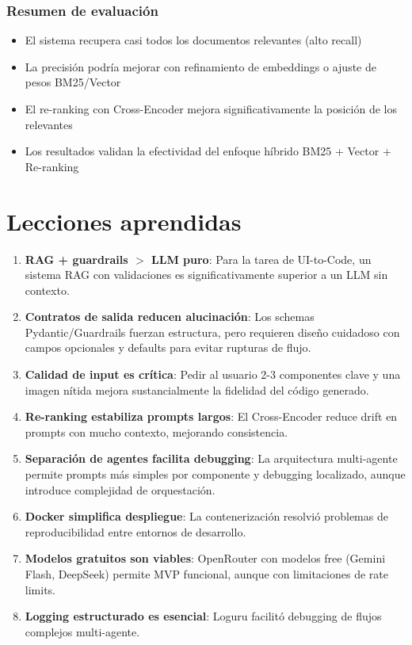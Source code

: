 \documentclass[12pt,a4paper]{article}
\begin{document}
\subsubsection{Resumen de evaluación}

\begin{itemize}
    \item El sistema recupera casi todos los documentos relevantes (alto recall)
    \item La precisión podría mejorar con refinamiento de embeddings o ajuste de pesos BM25/Vector
    \item El re-ranking con Cross-Encoder mejora significativamente la posición de los relevantes
    \item Los resultados validan la efectividad del enfoque híbrido BM25 + Vector + Re-ranking
\end{itemize}

\section{Lecciones aprendidas}

\begin{enumerate}
    \item \textbf{RAG + guardrails $>$ LLM puro}: Para la tarea de UI-to-Code, un sistema RAG con validaciones es significativamente superior a un LLM sin contexto.
    
    \item \textbf{Contratos de salida reducen alucinación}: Los schemas Pydantic/Guardrails fuerzan estructura, pero requieren diseño cuidadoso con campos opcionales y defaults para evitar rupturas de flujo.
    
    \item \textbf{Calidad de input es crítica}: Pedir al usuario 2-3 componentes clave y una imagen nítida mejora sustancialmente la fidelidad del código generado.
    
    \item \textbf{Re-ranking estabiliza prompts largos}: El Cross-Encoder reduce drift en prompts con mucho contexto, mejorando consistencia.
    
    \item \textbf{Separación de agentes facilita debugging}: La arquitectura multi-agente permite prompts más simples por componente y debugging localizado, aunque introduce complejidad de orquestación.
    
    \item \textbf{Docker simplifica despliegue}: La contenerización resolvió problemas de reproducibilidad entre entornos de desarrollo.
    
    \item \textbf{Modelos gratuitos son viables}: OpenRouter con modelos free (Gemini Flash, DeepSeek) permite MVP funcional, aunque con limitaciones de rate limits.
    
    \item \textbf{Logging estructurado es esencial}: Loguru facilitó debugging de flujos complejos multi-agente.
\end{enumerate}
\end{document}
